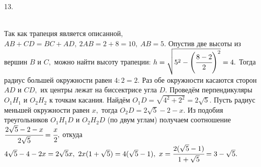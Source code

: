 13. \begin{figure}[ht!]
\end{figure}\\
Так как трапеция является описанной, $AB+CD=BC+AD,\ 2AB=2+8=10,\ AB=5.$ Опустив две высоты из вершин $B$ и $C,$ можно найти высоту трапеции: $h=\sqrt{5^2-\left(\cfrac{8-2}{2}\right)^2}=4.$ Тогда радиус большей окружности равен $4:2=2.$ Раз обе окружности касаются сторон $AD$ и $CD,$ их центры лежат на биссектрисе угла $D.$ Проведём перпендикуляры $O_1H_1$ и $O_2H_2$ к точкам касания. Найдём $O_1D=\sqrt{4^2+2^2}=2\sqrt{5}.$ Пусть радиус меньшей окружности равен $x,$ тогда  $O_2D=2\sqrt{5}-2-x.$ Из подобия треугольников $O_1H_1D$ и $O_2H_2D$ (по двум углам) получаем соотношение $\cfrac{2\sqrt{5}-2-x }{2\sqrt{5}}=\cfrac{x}{2},$ откуда $4\sqrt{5}-4-2x=2\sqrt{5}x,\ 2x(1+\sqrt{5})=4(\sqrt{5}-1),\ x=\cfrac{2(\sqrt{5}-1)}{1+\sqrt{5}}=3-\sqrt{5}.$\\

